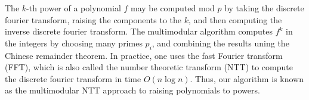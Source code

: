 
%
%
%
%

The \(k\)-th power of a polynomial \(f\) 
may be computed mod \(p\) by taking the discrete fourier
transform, raising the components to the \(k\),
and then computing the inverse discrete fourier transform.
The multimodular algorithm 
computes \(f^{k}\) in the integers by
choosing many primes \(p_{i}\), 
and combining the results uning the Chinese remainder theorem.
In practice, one uses the fast Fourier transform (FFT),
which is also called the number theoretic transform 
(NTT) to compute the discrete fourier
transform in time \(O(n \log n)\).
Thus, our algorithm is known as the 
multimodular NTT approach to raising polynomials to powers.


